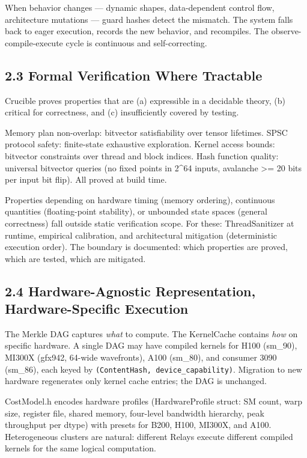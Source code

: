 When behavior changes --- dynamic shapes, data-dependent control flow, architecture mutations --- guard hashes detect the mismatch. The system falls back to eager execution, records the new behavior, and recompiles. The observe-compile-execute cycle is continuous and self-correcting.

\subsection{2.3 Formal Verification Where Tractable}\label{formal-verification-where-tractable}

Crucible proves properties that are (a) expressible in a decidable theory, (b) critical for correctness, and (c) insufficiently covered by testing.

Memory plan non-overlap: bitvector satisfiability over tensor lifetimes. SPSC protocol safety: finite-state exhaustive exploration. Kernel access bounds: bitvector constraints over thread and block indices. Hash function quality: universal bitvector queries (no fixed points in 2\^{}64 inputs, avalanche \textgreater= 20 bits per input bit flip). All proved at build time.

Properties depending on hardware timing (memory ordering), continuous quantities (floating-point stability), or unbounded state spaces (general correctness) fall outside static verification scope. For these: ThreadSanitizer at runtime, empirical calibration, and architectural mitigation (deterministic execution order). The boundary is documented: which properties are proved, which are tested, which are mitigated.

\subsection{2.4 Hardware-Agnostic Representation, Hardware-Specific Execution}\label{hardware-agnostic-representation-hardware-specific-execution}

The Merkle DAG captures \emph{what} to compute. The KernelCache contains \emph{how} on specific hardware. A single DAG may have compiled kernels for H100 (sm\_90), MI300X (gfx942, 64-wide wavefronts), A100 (sm\_80), and consumer 3090 (sm\_86), each keyed by \texttt{(ContentHash,\ device\_capability)}. Migration to new hardware regenerates only kernel cache entries; the DAG is unchanged.

CostModel.h encodes hardware profiles (HardwareProfile struct: SM count, warp size, register file, shared memory, four-level bandwidth hierarchy, peak throughput per dtype) with presets for B200, H100, MI300X, and A100. Heterogeneous clusters are natural: different Relays execute different compiled kernels for the same logical computation.

